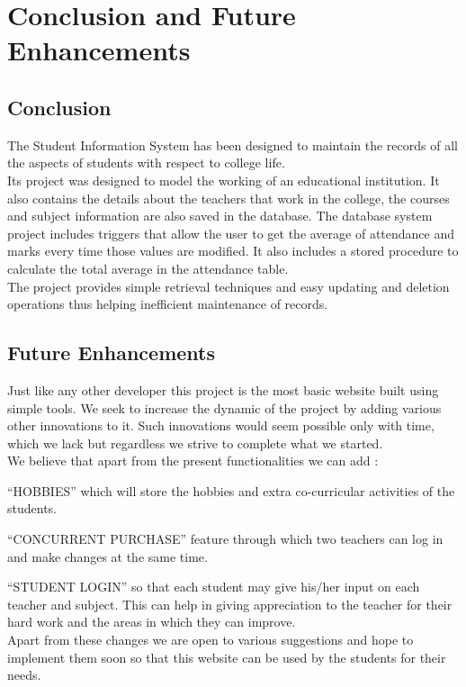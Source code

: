 \chapter{Conclusion and Future Enhancements}

\section{Conclusion}
The Student Information System has been designed to maintain the records of all the aspects of students with respect to college life.\\[0.1in] 

Its project was designed to model the working of an educational institution. It also contains the details about the teachers that work in the college, the courses and subject information are also saved in the database. The database system project includes triggers that allow the user to get the average of attendance and marks every time those values are modified. It also includes a stored procedure to calculate the total average in the attendance table.\\[0.1in]

The project provides simple retrieval techniques and easy updating and deletion operations thus helping inefficient maintenance of records.
\pagebreak

\section{Future Enhancements}
Just like any other developer this project is the most basic website built using simple tools. We seek to increase the dynamic of the project by adding various other innovations to it. Such innovations would seem possible only with time, which we lack but regardless we strive to complete what we started.\\[0.1in]

We believe that apart from the present functionalities we can add :

“HOBBIES” which will store the hobbies and extra co-curricular activities of the students.

“CONCURRENT PURCHASE” feature through which two teachers can log in and make changes at the same time.


“STUDENT LOGIN” so that each student may give his/her input on each teacher and subject. This can help in giving appreciation to the teacher for their hard  work and the areas in which they can improve.\\[0.1in]


Apart from these changes we are open to various suggestions and hope to implement them soon so that this website can be used by the students for their needs.





